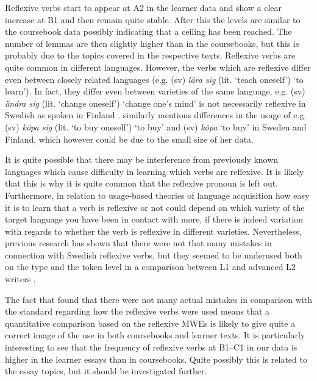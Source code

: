 \documentclass[output=paper,colorlinks,citecolor=brown]{langscibook}
\begin{document}
Reflexive verbs start to appear at A2 in the learner data and show a clear increase at B1 and then remain quite stable. After this the levels are similar to the coursebook data possibly indicating that a ceiling has been reached. The number of lemmas are then slightly higher than in the coursebooks, but this is probably due to the topics covered in the respective texts. Reflexive verbs are quite common in different languages. However, the verbs which are reflexive differ even between closely related languages 
\citep[][41]{enstrom1990feltyper} (e.g. (sv) \textit{lära sig}
(lit. `teach oneself') ‘to learn’). In fact, they differ even between varieties of the same language, e.g. (sv) \textit{ändra sig}  
(lit. `change oneself') `change one’s mind' is not necessarily reflexive in Swedish as spoken in Finland \citep[cf.][]{af2008finlandssvensk}. \citet{bjorklund2007prep} similarly mentions differences in the usage of e.g. (sv) \textit{köpa sig}
(lit. `to buy oneself') `to buy' and (sv) \textit{köpa} `to buy' in Sweden and Finland, which however could be due to the small size of her data. 

It is quite possible that there may be interference from previously known languages which cause difficulty in learning which verbs are reflexive. It is likely that this is why it is quite common that the reflexive pronoun is left out. 
Furthermore, in relation to usage-based theories of language acquisition how easy it is to learn that a verb is reflexive or not could depend on which variety of the target language you have been in contact with more, if there is indeed variation with regards to whether the verb is reflexive in different varieties. Nevertheless, previous research has shown that there were not that many mistakes in connection with Swedish reflexive verbs, but they seemed to be underused both on the type and the token level in a comparison between L1 and advanced L2 writers \citep[][93–94]{enstrom1990feltyper}. 

The fact that \citet{enstrom1990feltyper} 
found that there were not many actual mistakes in comparison with the standard regarding how the reflexive verbs were used means that a quantitative comparison based on the reflexive MWEs is likely to give quite a correct image of the use in both coursebooks and learner texts. 
It is particularly interesting to see that the frequency of reflexive verbs at B1--C1 in our data is higher in the learner essays than in coursebooks. Quite possibly this is related to the essay topics, but it should be investigated further. 
\end{document}
